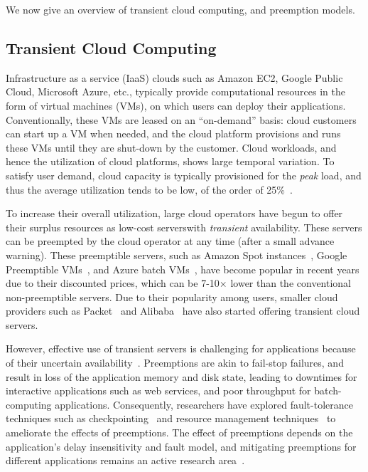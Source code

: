 \documentclass[compsoc]{IEEEtran}
\newcommand{\subsecspace}[0]{-0.20cm}
\begin{document}
We now give an overview of transient cloud computing, and preemption models. 



\vspace*{\subsecspace}
\subsection{Transient Cloud Computing}

Infrastructure as a service (IaaS) clouds such as Amazon EC2, Google Public Cloud, Microsoft Azure, etc., typically provide computational resources in the form of virtual machines (VMs), on which users can deploy their applications.
Conventionally, these VMs are leased on an ``on-demand'' basis: cloud customers can start up a VM when needed, and the cloud platform provisions and runs these VMs until they are shut-down by the customer. 
Cloud workloads, and hence the utilization of cloud platforms, shows large temporal variation. 
To satisfy user demand, cloud capacity is typically provisioned for the \emph{peak} load, and thus the average utilization tends to be low, of the order of 25\%~\cite{borg,resource-central-sosp17}.


To increase their overall utilization, large cloud operators have begun to offer their surplus resources as low-cost servers\footnotemark with \emph{transient} availability. These servers can be preempted by the cloud operator at any time (after a small advance warning). 
These preemptible servers, such as Amazon Spot instances~\cite{ec2-spot}, Google Preemptible VMs~\cite{preemptible-documentation}, and Azure batch VMs~\cite{azure-batch}, have become popular in recent years due to their discounted prices, which can be 7-10$\times$ lower than the conventional non-preemptible servers.
Due to their popularity among users, smaller cloud providers such as Packet~\cite{packet-spot} and Alibaba~\cite{alibaba-spot} have also started offering transient cloud servers. 


However, effective use of transient servers is challenging for applications because of their uncertain availability~\cite{transient, conductor, spot-run}. 
Preemptions are akin to fail-stop failures, and result in loss of the application memory and disk state, leading to downtimes for interactive applications such as web services, and poor throughput for batch-computing applications. 
Consequently, researchers have explored fault-tolerance techniques such as checkpointing~\cite{flint, marathe2014exploiting, spoton} and resource management techniques~\cite{exosphere} to ameliorate the effects of preemptions. 
The effect of preemptions depends on the application's delay insensitivity and fault model, and mitigating preemptions for different applications remains an active research area~\cite{hourglass-eurosys19}. 
\end{document}
